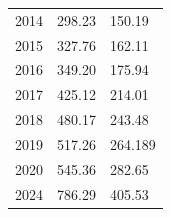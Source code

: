 \documentclass[openany]{book}
\begin{document}
\begin{longtable}{lll}
{\color[HTML]{202122} 2014} & {\color[HTML]{202122} 298.23} & {\color[HTML]{202122} 150.19} \\
\rowcolor[HTML]{F8F9FA} 
{\color[HTML]{202122} 2015} & {\color[HTML]{202122} 327.76} & {\color[HTML]{202122} 162.11} \\
\rowcolor[HTML]{F8F9FA} 
{\color[HTML]{202122} 2016} & {\color[HTML]{202122} 349.20} & {\color[HTML]{202122} 175.94} \\
\rowcolor[HTML]{F8F9FA} 
{\color[HTML]{202122} 2017} & {\color[HTML]{202122} 425.12} & {\color[HTML]{202122} 214.01} \\
\rowcolor[HTML]{F8F9FA} 
{\color[HTML]{202122} 2018} & {\color[HTML]{202122} 480.17} & {\color[HTML]{202122} 243.48} \\
\rowcolor[HTML]{F8F9FA} 
{\color[HTML]{202122} 2019} & {\color[HTML]{202122} 517.26} & {\color[HTML]{202122} 264.189} \\
\rowcolor[HTML]{F8F9FA} 
{\color[HTML]{202122} 2020} & {\color[HTML]{202122} 545.36} & {\color[HTML]{202122} 282.65} \\
\rowcolor[HTML]{F8F9FA} 
{\color[HTML]{202122} 2024} & {\color[HTML]{202122} 786.29} & {\color[HTML]{202122} 405.53}
\end{longtable}
\end{document}
